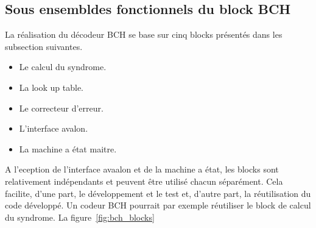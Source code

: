 \documentclass[a4paper, 11pt, svgnames]{report}
\begin{document}
            \subsection{Sous ensembldes fonctionnels du block BCH}
            \label{sec:fonc_bch}
            La réalisation du décodeur BCH se base sur cinq blocks
            présentés dans les subsection suivantes.
            \begin{itemize}
                \item Le calcul du syndrome.
                \item La look up table.
                \item Le correcteur d'erreur.
                \item L'interface avalon.
                \item La machine a état maitre.
            \end{itemize}
            A l'eception de l'interface avaalon et de la machine a état, les
            blocks sont relativement indépendants et peuvent être utilisé
            chacun séparément. Cela facilite, d'une part, le développement et
            le test et, d'autre part, la réutilisation du code développé. Un
            codeur BCH pourrait par exemple réutiliser le block de calcul du
            syndrome. La figure~\ref{fig:bch_blocks}
\end{document}
